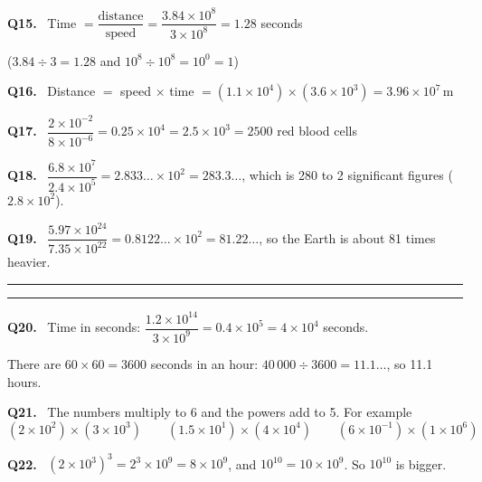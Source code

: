 \documentclass[12pt,a4paper]{article}
\newcommand{\wq}[1]{\par\addvspace{6pt}\noindent\textbf{Q#1.}\ }
\begin{document}
\wq{15} Time $=\dfrac{\text{distance}}{\text{speed}}=\dfrac{3.84\times10^8}{3\times10^8}=1.28$ seconds

($3.84\div3=1.28$ and $10^8\div10^8=10^0=1$)

\wq{16} Distance $=$ speed $\times$ time $=(1.1\times10^4)\times(3.6\times10^3)=3.96\times10^7$\,m

\wq{17} $\dfrac{2\times10^{-2}}{8\times10^{-6}}=0.25\times10^4=2.5\times10^3=2500$ red blood cells

\wq{18} $\dfrac{6.8\times10^7}{2.4\times10^5}=2.833\ldots\times10^2=283.3\ldots$, which is 280 to 2 significant figures ($2.8\times10^2$).

\wq{19} $\dfrac{5.97\times10^{24}}{7.35\times10^{22}}=0.8122\ldots\times10^2=81.22\ldots$, so the Earth is about 81 times heavier.

\par\addvspace{10pt}
\noindent\rule{\linewidth}{0.8pt}\par\nobreak\vspace{1pt}
\par\nobreak\vspace{1pt}
\noindent\rule{\linewidth}{0.4pt}\par\nobreak\vspace{4pt}

\wq{20} Time in seconds: $\dfrac{1.2\times10^{14}}{3\times10^9}=0.4\times10^5=4\times10^4$ seconds.

There are $60\times60=3600$ seconds in an hour: $40\,000\div3600=11.1\ldots$, so 11.1 hours.

\wq{21} The numbers multiply to 6 and the powers add to 5. For example
\[ (2\times10^2)\times(3\times10^3)\qquad (1.5\times10^1)\times(4\times10^4)\qquad (6\times10^{-1})\times(1\times10^6) \]

\wq{22} $(2\times10^3)^3=2^3\times10^9=8\times10^9$, and $10^{10}=10\times10^9$. So $10^{10}$ is bigger.
\end{document}
